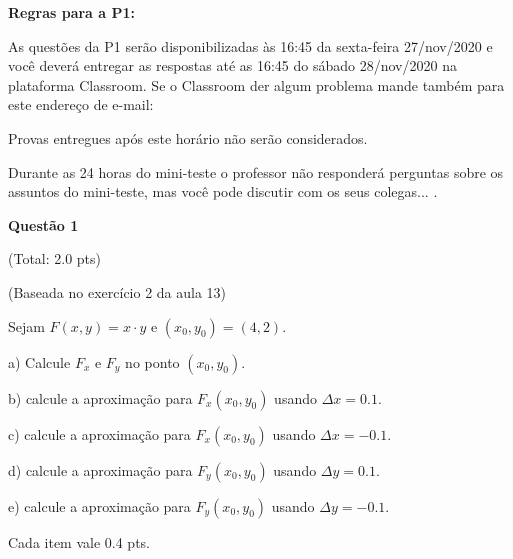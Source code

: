 \documentclass[oneside,12pt]{article}
\begin{document}

{\bf Regras para a P1:}

\ssk

As questões da P1 serão disponibilizadas às 16:45 da
sexta-feira 27/nov/2020 e você deverá entregar as respostas
 até as 16:45 do sábado 28/nov/2020 na
plataforma Classroom. Se o Classroom der algum problema mande também
para este endereço de e-mail:


\ssk


\ssk

Provas entregues após este horário não serão considerados.

Durante as 24 horas do mini-teste o professor não responderá perguntas
sobre os assuntos do mini-teste, mas você pode discutir com os seus
colegas... .


\newpage



{\bf Questão 1}

(Total: 2.0 pts)

(Baseada no exercício 2 da aula 13)

\ssk

Sejam $F(x,y) = x·y$ e $(x_0,y_0) = (4,2)$.

a) Calcule $F_x$ e $F_y$ no ponto $(x_0,y_0)$.

b) calcule a aproximação para $F_x(x_0,y_0)$ usando $Δx=0.1$.

c) calcule a aproximação para $F_x(x_0,y_0)$ usando $Δx=-0.1$.

d) calcule a aproximação para $F_y(x_0,y_0)$ usando $Δy=0.1$.

e) calcule a aproximação para $F_y(x_0,y_0)$ usando $Δy=-0.1$.

\msk

Cada item vale 0.4 pts.




\newpage


\end{document}
